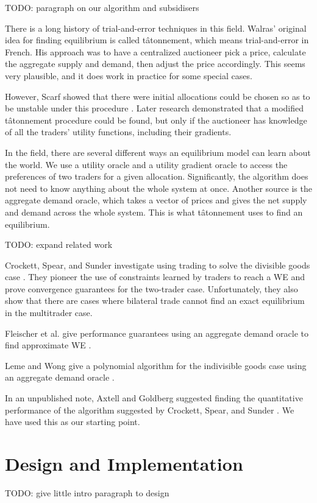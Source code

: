 \documentclass[12pt,a4paper,titlepage]{article}
\begin{document}
TODO: paragraph on our algorithm and subsidisers

There is a long history of trial-and-error techniques in this field.
Walras' original idea for finding equilibrium is called tâtonnement, which means trial-and-error in French.
His approach was to have a centralized auctioneer pick a price, calculate the aggregate supply and demand, then adjust the price accordingly.
This seems very plausible, and it does work in practice for some special cases.

However, Scarf showed that there were initial allocations could be chosen so as to be unstable under this procedure \cite{scarf}.
Later research demonstrated that a modified tâtonnement procedure could be found, but only if the auctioneer has knowledge of all the traders' utility functions, including their gradients.

In the field, there are several different ways an equilibrium model can learn about the world. 
We use a utility oracle and a utility gradient oracle to access the preferences of two traders for a given allocation.
Significantly, the algorithm does not need to know anything about the whole system at once.
Another source is the aggregate demand oracle, which takes a vector of prices and gives the net supply and demand across the whole system.
This is what tâtonnement uses to find an equilibrium.

TODO: expand related work

Crockett, Spear, and Sunder investigate using trading to solve the divisible goods case \cite{crockett}.
They pioneer the use of constraints learned by traders to reach a WE and prove convergence guarantees for the two-trader case.
Unfortunately, they also show that there are cases where bilateral trade cannot find an exact equilibrium in the multitrader case.

Fleischer et al. give performance guarantees using an aggregate demand oracle to find approximate WE \cite{fleischer}.

Leme and Wong give a polynomial algorithm for the indivisible goods case using an aggregate demand oracle \cite{leme}.

In an unpublished note, Axtell and Goldberg suggested finding the quantitative performance of the algorithm suggested by Crockett, Spear, and Sunder \cite{goldberg}.
We have used this as our starting point.



\section{Design and Implementation}\label{desimp}
TODO: give little intro paragraph to design
\end{document}
